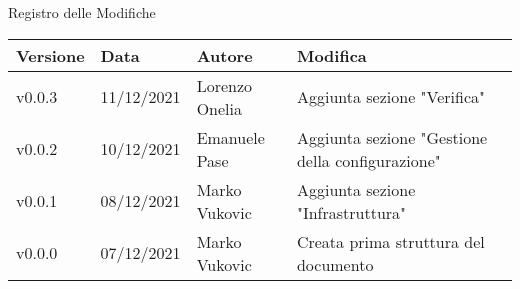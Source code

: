 \begin{center}
  \huge{Registro delle Modifiche}
\end{center}

\begin{center}
  \begin{tabular}{|p{2cm}|p{2cm}|p{3cm}|p{5cm}|}
    \hline
    \textbf{Versione} & \textbf{Data} & \textbf{Autore} & \textbf{Modifica}                    \\ \hline
    v0.0.3            & 11/12/2021    & Lorenzo Onelia  & Aggiunta sezione "Verifica" \\ \hline
    v0.0.2            & 10/12/2021    & Emanuele Pase   & Aggiunta sezione "Gestione della configurazione" \\ \hline
    v0.0.1            & 08/12/2021    & Marko Vukovic   & Aggiunta sezione "Infrastruttura" \\ \hline
    v0.0.0            & 07/12/2021    & Marko Vukovic   & Creata prima struttura del documento \\ \hline
  \end{tabular}
\end{center}
